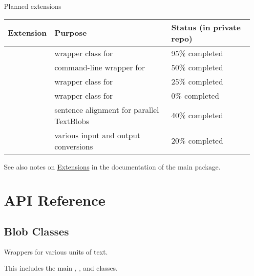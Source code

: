 \documentclass[letterpaper,10pt,english]{sphinxmanual}
\begin{document}
\begin{threeparttable}
\capstart\caption{Planned extensions}

\begin{tabulary}{\linewidth}{|L|L|L|}
\hline
\textsf{\relax 
Extension
} & \textsf{\relax 
Purpose
} & \textsf{\relax 
Status (in private repo)
}\\
\hline
{}
 & 
wrapper class for 
 & 
95\% completed
\\

 & 
command-line wrapper for 
 & 
50\% completed
\\

 & 
wrapper class for 
 & 
25\% completed
\\

 & 
wrapper class for 
 & 
0\% completed
\\

 & 
sentence alignment for parallel TextBlobs
 & 
40\% completed
\\

 & 
various input and output conversions
 & 
20\% completed
\\
\hline\end{tabulary}

\end{threeparttable}


See also notes on \href{http://textblob.readthedocs.org/en/dev/extensions.html}{Extensions}
in the documentation of the main package.


\section{API Reference}
\label{api_reference:api-reference}\label{api_reference:api}\label{api_reference::doc}

\subsection{Blob Classes}
\label{api_reference:blob-classes}\label{api_reference:module-textblob_de.blob}
Wrappers for various units of text.

This includes the main {\hyperref[api_reference:textblob_de.blob.TextBlobDE]{}},
{\hyperref[api_reference:textblob_de.blob.Word]{}}, and {\hyperref[api_reference:textblob_de.blob.WordList]{}} classes.
\end{document}
